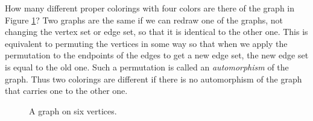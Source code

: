 \itemih How many different  proper colorings with four colors are there of the
graph in Figure \ref{starhexagon}?  Two graphs are the same if we
can redraw one of the graphs, not changing the vertex set or edge set, so that it is
identical to the other one.  This is equivalent to permuting the vertices in some
way so that when we apply the permutation to the endpoints of the edges to get a new
edge set, the new edge set is equal to the old one.  Such a permutation is called an
{\em automorphism} of the graph.  Thus two
colorings are different if there is no automorphism of the graph that carries one to
the other one.
\begin{figure}[htb]\caption{A graph on six vertices.}\label{starhexagon}\smallskip
\begin{center}\mbox{}
\end{center}  
\end{figure}
